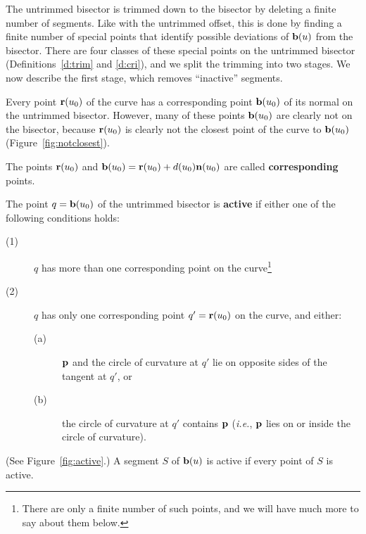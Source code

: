 The untrimmed bisector is trimmed down to the bisector by deleting
a finite number of segments.
Like with the untrimmed offset, this is done by finding
a finite number of special points that identify possible
deviations of ${\bf b}(u)$ from the bisector.
There are four classes of these special points on the untrimmed bisector
(Definitions~\ref{d:trim} and \ref{d:cri}), 
and we split the trimming into two stages.
We now describe the first stage, which removes ``inactive'' segments.

Every point ${\bf r}(u_0)$ of the curve has a corresponding point 
${\bf b}(u_0)$ of its normal on the untrimmed bisector.
However, many of these points ${\bf b}(u_0)$ are clearly not on the bisector,
because ${\bf r}(u_0)$ is clearly not the closest point of the curve to 
${\bf b}(u_0)$ (Figure~\ref{fig:notclosest}).


\begin{dfn}
The points ${\bf r}(u_0)$ and 
${\bf b}(u_0) = {\bf r}(u_0) + d(u_0){\bf n}(u_0)$ are called
{\bf corresponding} points.
\end{dfn}

\begin{dfn}
The point $q = {\bf b}(u_{0})$ of the untrimmed bisector
is {\bf active} if either one of the following conditions holds:
\begin{description}
\item[(1)]
	$q$ has more than one corresponding point on the curve\footnote{There
		are only a finite number of such points, and we will have
		much more to say about them below.}
\item[(2)]
	$q$ has only one corresponding point $q' = {\bf r}(u_0)$ on the curve,
	and either:
\begin{description}
\item[(a)]
	${\bf p}$ and the circle of curvature at $q'$
	lie on opposite sides of the tangent at $q'$, or
\item[(b)]
	the circle of curvature at $q'$ contains ${\bf p}$
	({\em i.e.}, ${\bf p}$ lies on or inside the circle of curvature).
\end{description}
\end{description}
(See Figure~\ref{fig:active}.)
A segment $S$ of ${\bf b}(u)$ is active if every point of $S$ is active.
\end{dfn}



